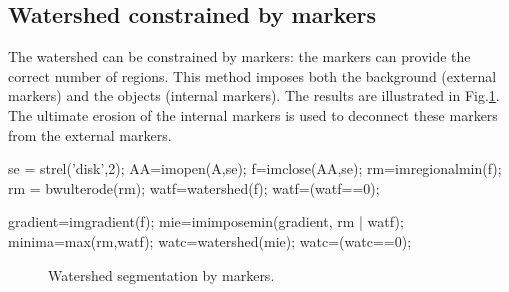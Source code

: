 \subsection{Watershed constrained by markers}
The watershed can be constrained by markers: the markers can provide the correct number of regions. This method imposes both the background
(external markers) and the objects (internal markers). The results are illustrated in Fig.\ref{fig:watershed:matlab:constrained}.
The ultimate erosion of the internal markers is used to deconnect these markers from the external markers.

\begin{matlab}
se = strel('disk',2);
AA=imopen(A,se);
f=imclose(AA,se);
rm=imregionalmin(f);
rm = bwulterode(rm);
watf=watershed(f);
watf=(watf==0);

gradient=imgradient(f);
mie=imimposemin(gradient, rm | watf);
minima=max(rm,watf);
watc=watershed(mie);
watc=(watc==0);
\end{matlab}

\begin{figure}[htbp]
 \centering
  \hfill
  \hfill
 \caption{Watershed segmentation by markers.}
 \label{fig:watershed:matlab:constrained}
\end{figure}

